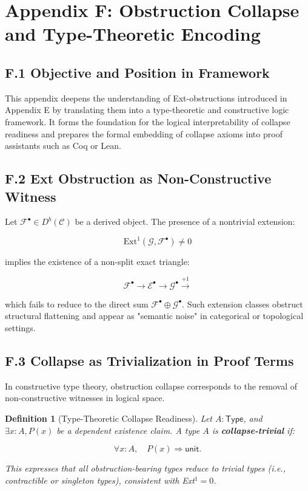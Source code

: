 \documentclass[11pt]{article}
\newtheorem{definition}[theorem]{Definition}
\begin{document}
\section*{Appendix F: Obstruction Collapse and Type-Theoretic Encoding}

\subsection*{F.1 Objective and Position in Framework}

This appendix deepens the understanding of Ext-obstructions introduced in Appendix E  
by translating them into a type-theoretic and constructive logic framework.  
It forms the foundation for the logical interpretability of collapse readiness  
and prepares the formal embedding of collapse axioms into proof assistants  
such as Coq or Lean.

\subsection*{F.2 Ext Obstruction as Non-Constructive Witness}

Let \( \mathcal{F}^\bullet \in D^b(\mathcal{C}) \) be a derived object.  
The presence of a nontrivial extension:

\[
\mathrm{Ext}^1(\mathcal{G}, \mathcal{F}^\bullet) \neq 0
\]

implies the existence of a non-split exact triangle:

\[
\mathcal{F}^\bullet \longrightarrow \mathcal{E}^\bullet \longrightarrow \mathcal{G}^\bullet \overset{+1}{\longrightarrow}
\]

which fails to reduce to the direct sum \( \mathcal{F}^\bullet \oplus \mathcal{G}^\bullet \).  
Such extension classes obstruct structural flattening and appear as "semantic noise"  
in categorical or topological settings.

\subsection*{F.3 Collapse as Trivialization in Proof Terms}

In constructive type theory, obstruction collapse corresponds to the removal  
of non-constructive witnesses in logical space.

\begin{definition}[Type-Theoretic Collapse Readiness]
Let \( A : \mathsf{Type} \), and \( \exists x : A, P(x) \) be a dependent existence claim.  
A type \( A \) is \textbf{collapse-trivial} if:

\[
\forall x : A, \quad P(x) \Rightarrow \mathsf{unit}.
\]

This expresses that all obstruction-bearing types reduce to trivial types  
(i.e., contractible or singleton types), consistent with Ext$^1 = 0$.
\end{definition}
\end{document}
